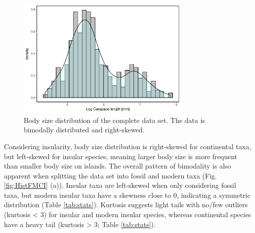 \begin{figure}[htbp]
	\centering
	\includegraphics[width=0.75\textwidth]{MA_JJ_files/figure-latex/HistAll-1.pdf}
	\caption[Body size distribution of the complete data set]{Body size distribution of the complete data set. The data is bimodally distributed and right-skewed.}
	\label{fig:histAll}
\end{figure}

Considering insularity, body size distribution is right-skewed for continental taxa, but left-skewed for insular species, meaning larger body size is more frequent than smaller body size on islands. The overall pattern of bimodality is also apparent when splitting the data set into fossil and modern taxa (Fig. \ref{fig:HistFMCI} (a)). Insular taxa are left-skewed when only considering fossil taxa, but modern insular taxa have a skewness close to 0, indicating a symmetric distribution (Table \ref{tab:stats}).
Kurtosis suggests light tails with no/few outliers (kurtosis < 3) for insular and modern insular species, whereas continental species have a heavy tail (kurtosis > 3; Table \ref{tab:stats}).

